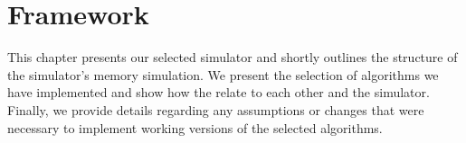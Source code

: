 \chapter{Framework}
\label{cpt:framework}

This chapter presents our selected simulator and shortly outlines the structure of the simulator's memory simulation.
We present the selection of algorithms we have implemented and show how the relate to each other and the simulator.
Finally, we provide details regarding any assumptions or changes that were necessary to implement working versions of the selected algorithms.






